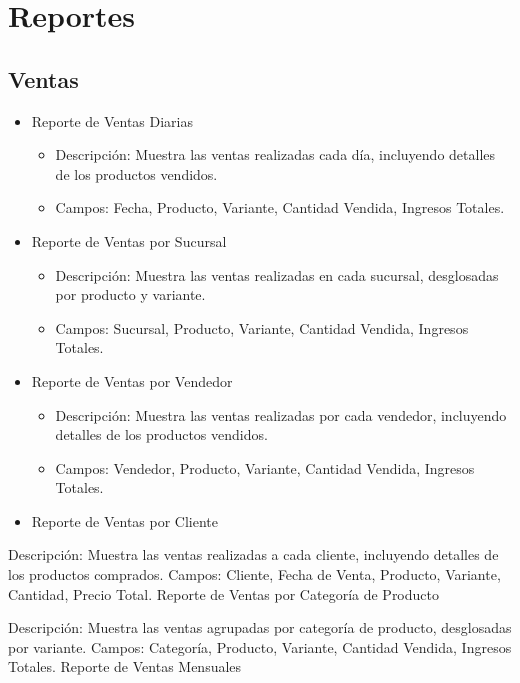 \documentclass[
  letterpaper,
  DIV=11,
  numbers=noendperiod]{scrreprt}
\providecommand{\tightlist}{%
  \setlength{\itemsep}{0pt}\setlength{\parskip}{0pt}}\usepackage{longtable,booktabs,array}
\begin{document}
\section{Reportes}\label{reportes}

\subsection{Ventas}\label{ventas}

\begin{itemize}
\tightlist
\item
  Reporte de Ventas Diarias

  \begin{itemize}
  \tightlist
  \item
    Descripción: Muestra las ventas realizadas cada día, incluyendo
    detalles de los productos vendidos.
  \item
    Campos: Fecha, Producto, Variante, Cantidad Vendida, Ingresos
    Totales.
  \end{itemize}
\item
  Reporte de Ventas por Sucursal

  \begin{itemize}
  \tightlist
  \item
    Descripción: Muestra las ventas realizadas en cada sucursal,
    desglosadas por producto y variante.
  \item
    Campos: Sucursal, Producto, Variante, Cantidad Vendida, Ingresos
    Totales.
  \end{itemize}
\item
  Reporte de Ventas por Vendedor

  \begin{itemize}
  \tightlist
  \item
    Descripción: Muestra las ventas realizadas por cada vendedor,
    incluyendo detalles de los productos vendidos.
  \item
    Campos: Vendedor, Producto, Variante, Cantidad Vendida, Ingresos
    Totales.
  \end{itemize}
\item
  Reporte de Ventas por Cliente
\end{itemize}

Descripción: Muestra las ventas realizadas a cada cliente, incluyendo
detalles de los productos comprados. Campos: Cliente, Fecha de Venta,
Producto, Variante, Cantidad, Precio Total. Reporte de Ventas por
Categoría de Producto

Descripción: Muestra las ventas agrupadas por categoría de producto,
desglosadas por variante. Campos: Categoría, Producto, Variante,
Cantidad Vendida, Ingresos Totales. Reporte de Ventas Mensuales
\end{document}
